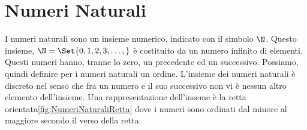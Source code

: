 \chapter{Numeri Naturali}
\label{cha:NumeriNaturali}
\minitoc
\mtcskip                                %
\minilof                                %
\mtcskip                                %
\minilot
I numeri naturali sono un insieme numerico, indicato con il simbolo $\N$. Questo insieme, $\N=\Set{0,1,2,3,\dots,}$ è  costituito da un numero infinito di elementi. Questi numeri hanno, tranne lo zero, un precedente ed un successivo. Possiamo, quindi definire per i numeri naturali un ordine.  L'insieme dei numeri naturali è discreto nel senso che fra un numero e il suo successivo non vi è nessun altro elemento dell'insieme. Una rappresentazione dell'inseme  è la retta orientata\nobs\vref{fig:NumeriNaturaliRetta} dove i numeri sono ordinati dal minore al maggiore secondo il verso della retta. 
